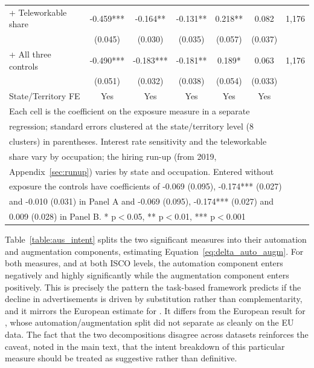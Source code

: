\documentclass[11pt]{article}
\begin{document}
\begin{table}[H]
\begin{tabular}{lcccccc}
+ Teleworkable share & -0.459*** & -0.164** & -0.131** & 0.218** & 0.082 & 1,176 \\
 & (0.045) & (0.030) & (0.035) & (0.057) & (0.037) & \\
+ All three controls & -0.490*** & -0.183*** & -0.181** & 0.189* & 0.063 & 1,176 \\
 & (0.051) & (0.032) & (0.038) & (0.054) & (0.033) & \\
\midrule
State/Territory FE & Yes & Yes & Yes & Yes & Yes & \\
\hline\hline
\multicolumn{7}{l}{\footnotesize Each cell is the coefficient on the exposure measure in a separate} \\
\multicolumn{7}{l}{\footnotesize regression; standard errors clustered at the state/territory level (8} \\
\multicolumn{7}{l}{\footnotesize clusters) in parentheses. Interest rate sensitivity and the teleworkable} \\
\multicolumn{7}{l}{\footnotesize share vary by occupation; the hiring run-up (from 2019,} \\
\multicolumn{7}{l}{\footnotesize Appendix~\ref{sec:runup}) varies by state and occupation. Entered without} \\
\multicolumn{7}{l}{\footnotesize exposure the controls have coefficients of -0.069 (0.095), -0.174*** (0.027)} \\
\multicolumn{7}{l}{\footnotesize and -0.010 (0.031) in Panel A and -0.069 (0.095), -0.174*** (0.027) and} \\
\multicolumn{7}{l}{\footnotesize 0.009 (0.028) in Panel B. * p$<$0.05, ** p$<$0.01, *** p$<$0.001} \\
\end{tabular}
\label{table:aus_horse_race}
\end{table}

Table~\ref{table:aus_intent} splits the two significant measures into their automation and augmentation components, estimating Equation~\ref{eq:delta_auto_augm}. For both measures, and at both ISCO levels, the automation component enters negatively and highly significantly while the augmentation component enters positively. This is precisely the pattern the task-based framework predicts if the decline in advertisements is driven by substitution rather than complementarity, and it mirrors the European estimate for \citet{handa2025economic}. It differs from the European result for \citet{demirev2024assessing}, whose automation/augmentation split did not separate as cleanly on the EU data. The fact that the two decompositions disagree across datasets reinforces the caveat, noted in the main text, that the intent breakdown of this particular measure should be treated as suggestive rather than definitive.
\end{document}
